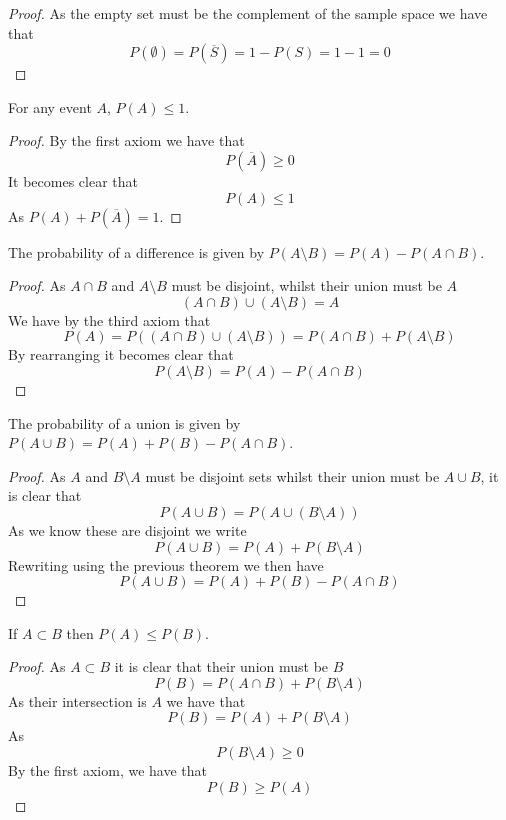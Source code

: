 \begin{proof}
  As the empty set must be the complement of the sample space we have that
  \[
      P(\emptyset)=P(\overline{S})=1-P(S)=1-1=0
  \]
\end{proof}
\begin{theorem}
  For any event $A$, $P(A)\leq 1$.
\end{theorem}
\begin{proof}
  By the first axiom we have that
  \[
      P(\overline{A})\geq 0
  \]
  It becomes clear that
  \[
      P(A)\leq 1
  \]
  As $P(A)+P(\overline{A})=1$.
\end{proof}
\begin{theorem}
  The probability of a difference is given by $P(A\setminus B)=P(A)-P(A\cap B)$.
\end{theorem}
\begin{proof}
  As $A\cap B$ and $A\setminus B$ must be disjoint, whilst their union must be $A$
  \[
      (A\cap B)\cup(A\setminus B)=A
  \]
  We have by the third axiom that
  \[
      P(A)=P((A\cap B)\cup(A\setminus B))=P(A\cap B)+P(A\setminus B)
  \]
  By rearranging it becomes clear that
  \[
      P(A\setminus B)=P(A)-P(A\cap B)
  \]
\end{proof}
\begin{theorem}
  The probability of a union is given by $P(A\cup B)=P(A)+P(B)-P(A\cap B)$.
\end{theorem}
\begin{proof}
  As $A$ and $B\setminus A$ must be disjoint sets whilst their union must be $A\cup B$, it is clear that
  \[
      P(A\cup B)=P(A\cup (B\setminus A))
  \]
  As we know these are disjoint we write
  \[
      P(A\cup B)=P(A)+P(B\setminus A)
  \]
  Rewriting using the previous theorem we then have
  \[
      P(A\cup B)=P(A)+P(B)-P(A\cap B)
  \]
\end{proof}
\begin{theorem}
  If $A\subset B$ then $P(A)\leq P(B)$.
\end{theorem}
\begin{proof}
  As $A\subset B$ it is clear that their union must be $B$
  \[
      P(B)=P(A\cap B)+P(B\setminus A)
  \]
  As their intersection is $A$ we have that
  \[
      P(B)=P(A)+P(B\setminus A)
  \]
  As
  \[
      P(B\setminus A)\geq 0
  \]
  By the first axiom, we have that
  \[
      P(B)\geq P(A)
  \]
\end{proof}
